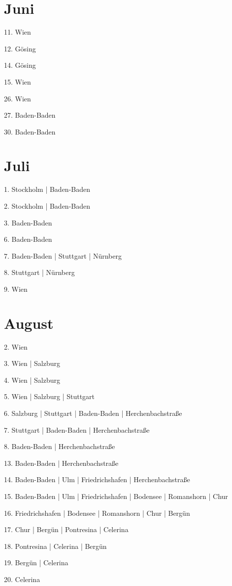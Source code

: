 \documentclass[twoside=false,titlepage=false,open=any, parskip=never, fontsize=10pt, headings=small, chapterprefix=false, appendixprefix=false, DIV=15]{scrbook}
\begin{document}
\begin{multicols}{3}
            \section*{Juni}
            11. Wien\par
            12. Gösing\par
            14. Gösing\par
            15. Wien\par
            26. Wien\par
            27. Baden-Baden\par
            30. Baden-Baden\par
            \section*{Juli}
            1. Stockholm | Baden-Baden\par
            2. Stockholm | Baden-Baden\par
            3. Baden-Baden\par
            6. Baden-Baden\par
            7. Baden-Baden | Stuttgart | Nürnberg\par
            8. Stuttgart | Nürnberg\par
            9. Wien\par
            \section*{August}
            2. Wien\par
            3. Wien | Salzburg\par
            4. Wien | Salzburg\par
            5. Wien | Salzburg | Stuttgart\par
            6. Salzburg | Stuttgart | Baden-Baden | Herchenbachstraße\par
            7. Stuttgart | Baden-Baden | Herchenbachstraße\par
            8. Baden-Baden | Herchenbachstraße\par
            13. Baden-Baden | Herchenbachstraße\par
            14. Baden-Baden | Ulm | Friedrichshafen | Herchenbachstraße\par
            15. Baden-Baden | Ulm | Friedrichshafen | Bodensee | Romanshorn | Chur\par
            16. Friedrichshafen | Bodensee | Romanshorn | Chur | Bergün\par
            17. Chur | Bergün | Pontresina | Celerina\par
            18. Pontresina | Celerina | Bergün\par
            19. Bergün | Celerina\par
            20. Celerina\par

\end{multicols}
\end{document}
